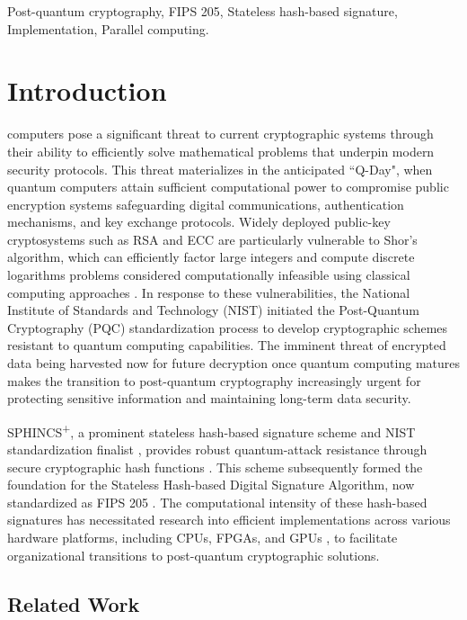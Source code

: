\documentclass[journal]{IEEEtran}
\begin{document}
\begin{IEEEkeywords}
  Post-quantum cryptography, FIPS 205, Stateless hash-based signature, Implementation, Parallel computing.
\end{IEEEkeywords}

\section{Introduction}
\label{sec:intro}

 computers pose a significant threat to current cryptographic systems through their ability to efficiently solve mathematical problems that underpin modern security protocols. This threat materializes in the anticipated ``Q-Day", when quantum computers attain sufficient computational power to compromise public encryption systems safeguarding digital communications, authentication mechanisms, and key exchange protocols. Widely deployed public-key cryptosystems such as RSA and ECC are particularly vulnerable to Shor's algorithm, which can efficiently factor large integers and compute discrete logarithms problems considered computationally infeasible using classical computing approaches \cite{Yang2023}.
In response to these vulnerabilities, the National Institute of Standards and Technology (NIST) initiated the Post-Quantum Cryptography (PQC) standardization process to develop cryptographic schemes resistant to quantum computing capabilities. The imminent threat of encrypted data being harvested now for future decryption once quantum computing matures makes the transition to post-quantum cryptography increasingly urgent for protecting sensitive information and maintaining long-term data security.

SPHINCS\textsuperscript{+}, a prominent stateless hash-based signature scheme and NIST standardization finalist \cite{Yesina}, provides robust quantum-attack resistance through secure cryptographic hash functions \cite{Bernstein2019}. This scheme subsequently formed the foundation for the Stateless Hash-based Digital Signature Algorithm, now standardized as FIPS 205 \cite{FIPS205}. The computational intensity of these hash-based signatures has necessitated research into efficient implementations across various hardware platforms, including CPUs, FPGAs, and GPUs \cite{Joseph2022}, to facilitate organizational transitions to post-quantum cryptographic solutions.

\subsection{Related Work}
\end{document}

